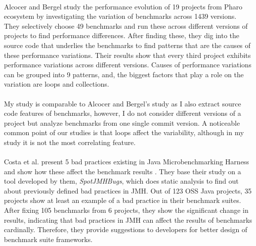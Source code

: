 \documentclass{seal_thesis}
\begin{document}
\\
Alcocer and Bergel \cite{Alcocer:2015:TDP:2816707.2816718} study the performance evolution of 19 projects from Pharo ecosystem by investigating the variation of benchmarks across 1439 versions. They selectively choose 49 benchmarks and run these across different versions of projects to find performance differences. After finding these, they dig into the source code that underlies the benchmarks to find patterns that are the causes of these performance variations. Their results show that every third project exhibits performance variations across different versions. Causes of performance variations can be grouped into 9 patterns, and, the biggest factors that play a role on the variation are loops and collections.\\
\\
My study is comparable to Alcocer and Bergel's study \cite{Alcocer:2015:TDP:2816707.2816718} as I also extract source code features of benchmarks, however, I do not consider different versions of a project but analyze benchmarks from one single commit version. A noticeable common point of our studies is that loops affect the variability, although in my study it is not the most correlating feature.\\
\\
Costa et al. present 5 bad practices existing in Java Microbenchmarking Harness and show how these affect the benchmark results \cite{costa2019}. They base their study on a tool developed by them, \textit{SpotJMHBugs}, which does static analysis to find out about previously defined bad practices in JMH. Out of 123 OSS Java projects, 35 projects show at least an example of a bad practice in their benchmark suites. After fixing 105 benchmarks from 6 projects, they show the significant change in results, indicating that bad practices in JMH can affect the results of benchmarks cardinally. Therefore, they provide suggestions to developers for better design of benchmark suite frameworks.\\
\\
\end{document}
